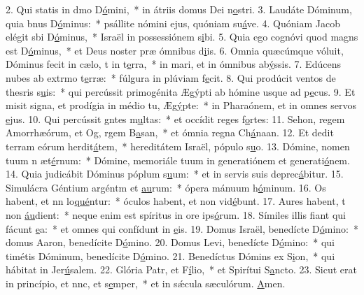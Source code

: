2. Qui statis in dmo D\uline{ó}mini,~* in átriis domus Dei n\uline{o}stri.
3. Laudáte Dóminum, quia bnus D\uline{ó}minus:~* psállite nómini ejus, quóniam su\uline{á}ve.
4. Quóniam Jacob elégit sbi D\uline{ó}minus,~* Israël in possessiónem s\uline{i}bi.
5. Quia ego cognóvi quod magns est D\uline{ó}minus,~* et Deus noster præ ómnibus d\uline{i}is.
6. Omnia quæcúmque vóluit, Dóminus fecit in cælo, t in t\uline{e}rra,~* in mari, et in ómnibus ab\uline{ý}ssis.
7. Edúcens nubes ab extrmo t\uline{e}rræ:~* fúlgura in plúviam f\uline{e}cit.
8. Qui prodúcit ventos de thesris s\uline{u}is:~* qui percússit primogénita Ægýpti ab hómine usque ad p\uline{e}cus.
9. Et misit signa, et prodígia in médio tu, Æg\uline{ý}pte:~* in Pharaónem, et in omnes servos \uline{e}jus.
10. Qui percússit gntes m\uline{u}ltas:~* et occídit reges f\uline{o}rtes:
11. Sehon, regem Amorrhæórum, et Og, rgem B\uline{a}san,~* et ómnia regna Ch\uline{á}naan.
12. Et dedit terram eórum herdit\uline{á}tem,~* hereditátem Israël, pópulo s\uline{u}o.
13. Dómine, nomen tuum n æt\uline{é}rnum:~* Dómine, memoriále tuum in generatiónem et generati\uline{ó}nem.
14. Quia judicábit Dóminus póplum s\uline{u}um:~* et in servis suis deprec\uline{á}bitur.
15. Simulácra Géntium argéntm et \uline{au}rum:~* ópera mánuum h\uline{ó}minum.
16. Os habent, et nn lo\uline{qué}ntur:~* óculos habent, et non vid\uline{é}bunt.
17. Aures habent, t non \uline{áu}dient:~* neque enim est spíritus in ore ips\uline{ó}rum.
18. Símiles illis fiant qui fácunt \uline{e}a:~* et omnes qui confídunt in \uline{e}is.
19. Domus Israël, benedícte D\uline{ó}mino:~* domus Aaron, benedícite D\uline{ó}mino.
20. Domus Levi, benedícte D\uline{ó}mino:~* qui timétis Dóminum, benedícite D\uline{ó}mino.
21. Benedíctus Dómins ex S\uline{i}on,~* qui hábitat in Jer\uline{ú}salem.
22. Glória Patr, et F\uline{í}lio,~* et Spirítui S\uline{a}ncto.
23. Sicut erat in princípio, et nnc, et s\uline{e}mper,~* et in sǽcula sæculórum. \uline{A}men.
